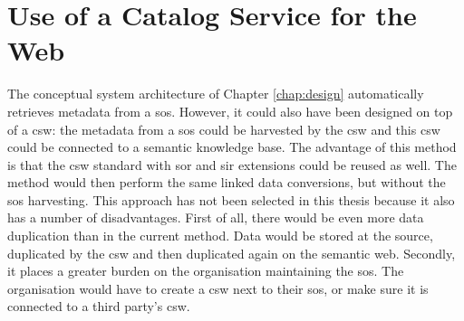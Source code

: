 \section{Use of a Catalog Service for the Web}
\label{useCSW}
The conceptual system architecture of Chapter \ref{chap:design} automatically retrieves metadata from a \ac{sos}. However, it could also have been designed on top of a \ac{csw}: the metadata from a \ac{sos} could be harvested by the \ac{csw} and this \ac{csw} could be connected to a semantic knowledge base. The advantage of this method is that the \ac{csw} standard with \ac{sor} and \ac{sir} extensions could be reused as well. The method would then perform the same linked data conversions, but without the \ac{sos} harvesting. This approach has not been selected in this thesis because it also has a number of disadvantages. First of all, there would be even more data duplication than in the current method. Data would be stored at the source, duplicated by the \ac{csw} and then duplicated again on the semantic web. Secondly, it places a greater burden on the organisation maintaining the \ac{sos}. The organisation would have to create a \ac{csw} next to their \ac{sos}, or make sure it is connected to a third party's \ac{csw}.  